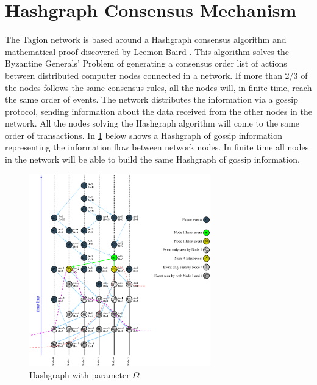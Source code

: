 \section{Hashgraph Consensus Mechanism} \label{sec:hashgraph_cm}
The Tagion network is based around a Hashgraph consensus algorithm and mathematical proof discovered by Leemon Baird \cite{SWIRLDS_HASHGRAPH}. This algorithm solves the Byzantine Generals’ Problem of generating a consensus order list of actions between distributed computer nodes connected in a network.
If more than 2/3 of the nodes follows the same consensus rules, all the nodes will, in finite time, reach the same order of events.
The network distributes the information via a gossip protocol, sending information about the data received from the other nodes in the network. All the nodes solving the Hashgraph algorithm will come to the same order of transactions.
In \cref{fig:wavefront} below shows a Hashgraph of gossip information representing the information flow between network nodes. In finite time all nodes in the network will be able to build the same Hashgraph of gossip information.


\begin{figure}[ht]
 \centering
 \includegraphics[width=0.7\textwidth]{fig/wavefront_and_order_long.eps}
 \caption{Hashgraph with parameter $\Omega$}
 \label{fig:wavefront}
\end{figure}

